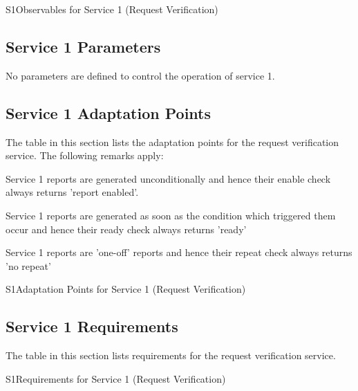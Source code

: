 \documentclass[a4paper,10pt]{article}
\newenvironment{fw_itemize}						%
{\begin{itemize}
  \setlength{\itemsep}{1mm}
  \setlength{\parskip}{0pt}
  \setlength{\parsep}{0pt}}
{\end{itemize}}
\newenvironment{cr_req}[2]
{
\begin{longtable}{|l|p{11.8cm}|}
\caption{#2}\label{tab:Req-#1} \\
\hline
\rowcolor{light-gray}
\textbf{Req. ID} & \textbf{Requirement Text}\\
\hline\hline
\endfirsthead
\rowcolor{light-gray}
\textbf{Req. ID} & \textbf{Requirement Text}\\
\hline\hline
\endhead
\DTLforeach*[\DTLiseq{\cat}{#1}]{dbReq}{\cat=Category,\type=Type,\id=Id,\reqText=Text}
{\DTLiffirstrow{}{\\\hline}P-\cat-\id/\type & \textit{\reqText}}\\\hline
}
{\end{longtable}}
\newenvironment{cr_ap}[2]
{
\begin{longtable}{|l|p{4.7cm}|p{6.9cm}|}
\caption{#2}\label{tab:AP-#1} \\
\hline
\rowcolor{light-gray}
\textbf{AP ID} & \textbf{Adaptation Point} & \textbf{Default Value}\\
\hline\hline
\endfirsthead
\rowcolor{light-gray}
\textbf{AP ID} & \textbf{Adaptation Point} & \textbf{Default Value}\\
\hline\hline
\endhead
\DTLforeach*[\DTLiseq{\cat}{#1}]{dbAP}{\cat=Category,\origin=Origin,\id=Id,\ap=AP,\defValue=DefValue}
{\DTLiffirstrow{}{\\\hline}P-\cat-\id & \ap\ (\origin) & \defValue}\\\hline
}
{\end{longtable}}
\newenvironment{cr_obs}[2]
{
\begin{longtable}{|l|p{9.5cm}|}
\caption{#2}\label{tab:Obs-#1} \\
\hline
\rowcolor{light-gray}
\textbf{Name} & \textbf{Description}\\
\hline\hline
\endfirsthead
\rowcolor{light-gray}
\textbf{Name} & \textbf{Description}\\
\hline\hline
\endhead
\DTLforeach*[\DTLiseq{\cat}{#1}]{dbObs}{\cat=Category,\name=Name,\desc=Desc}
{\DTLiffirstrow{}{\\\hline}\texttt{\name} & \desc}\\\hline
}
{\end{longtable}}
\begin{document}
\begin{cr_obs}{S1}{Observables for Service 1 (Request Verification)}
\end{cr_obs}

\subsection{Service 1 Parameters}\label{sec:serv1Par}
No parameters are defined to control the operation of service 1.


\subsection{Service 1 Adaptation Points}\label{sec:serv1AP}
The table in this section lists the adaptation points for the request verification service. The following remarks apply: 

\begin{fw_itemize}
\item Service 1 reports are generated unconditionally and hence their enable check always returns 'report enabled'.
\item Service 1 reports are generated as soon as the condition which triggered them occur and hence their ready check always returns 'ready'
\item Service 1 reports are 'one-off' reports and hence their repeat check always returns 'no repeat'
\end{fw_itemize}

\begin{cr_ap}{S1}{Adaptation Points for Service 1 (Request Verification)}
\end{cr_ap}


\subsection{Service 1 Requirements}
The table in this section lists requirements for the request verification service.

\begin{cr_req}{S1}{Requirements for Service 1 (Request Verification)}
\end{cr_req}
\end{document}
